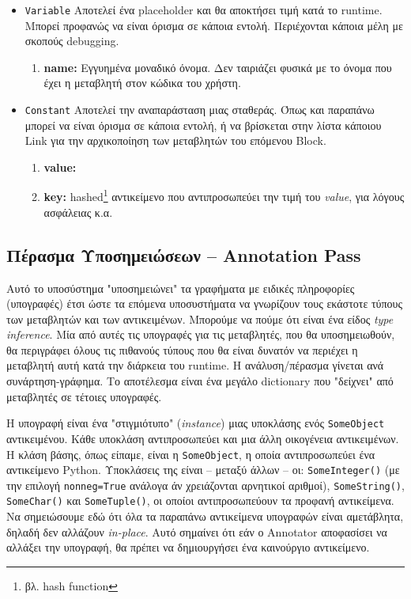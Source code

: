 \begin{itemize}
\item \texttt{Variable} Αποτελεί ένα placeholder και θα αποκτήσει τιμή κατά το
runtime. Μπορεί προφανώς να είναι όρισμα σε κάποια εντολή. Περιέχονται κάποια 
μέλη με σκοπούς debugging.

\begin{enumerate}
\item \textbf{name:} Εγγυημένα μοναδικό όνομα. Δεν ταιριάζει φυσικά με το 
όνομα που έχει η μεταβλητή στον κώδικα του χρήστη.
\end{enumerate}

\item \texttt{Constant} Αποτελεί την αναπαράσταση μιας σταθεράς. Όπως και 
παραπάνω μπορεί να είναι όρισμα σε κάποια εντολή, ή να βρίσκεται στην λίστα 
κάποιου Link για την αρχικοποίηση των μεταβλητών του επόμενου Block.

\begin{enumerate}
\item \textbf{value:}
\item \textbf{key:} hashed\footnote{βλ. hash function} αντικείμενο που 
αντιπροσωπεύει την τιμή του \textit{value}, για λόγους ασφάλειας κ.α.
\end{enumerate}

\end{itemize}

\subsection{Πέρασμα Υποσημειώσεων – Annotation Pass}

Αυτό το υποσύστημα "υποσημειώνει" τα γραφήματα με ειδικές πληροφορίες
(υπογραφές) έτσι ώστε τα επόμενα υποσυστήματα να γνωρίζουν τους εκάστοτε τύπους
των μεταβλητών και των αντικειμένων. Μπορούμε να πούμε ότι είναι ένα είδος
\textit{type inference}. Μία από αυτές τις υπογραφές για τις μεταβλητές, που θα
υποσημειωθούν, θα περιγράφει όλους τις πιθανούς τύπους που θα είναι δυνατόν να
περιέχει η μεταβλητή αυτή κατά την διάρκεια του runtime. Η ανάλυση/πέρασμα
γίνεται ανά συνάρτηση-γράφημα. Το αποτέλεσμα είναι ένα μεγάλο dictionary που
"δείχνει" από μεταβλητές σε τέτοιες υπογραφές.

Η υπογραφή είναι ένα "στιγμιότυπο" (\textit{instance}) μιας υποκλάσης ενός
\texttt{SomeObject} αντικειμένου. Κάθε υποκλάση αντιπροσωπεύει και μια άλλη
οικογένεια αντικειμένων. Η κλάση βάσης, όπως είπαμε, είναι η
\texttt{SomeObject}, η οποία αντιπροσωπεύει ένα αντικείμενο Python. Υποκλάσεις
της είναι – μεταξύ άλλων – οι: \texttt{SomeInteger()} (με την επιλογή
\texttt{nonneg=True} ανάλογα άν χρειάζονται αρνητικοί αριθμοί),
\texttt{SomeString()}, \texttt{SomeChar()} και \texttt{SomeTuple()}, οι οποίοι
αντιπροσωπεύουν τα προφανή αντικείμενα. Να σημειώσουμε εδώ ότι όλα τα παραπάνω 
αντικείμενα υπογραφών είναι αμετάβλητα, δηλαδή δεν αλλάζουν \textit{in-place}. 
Αυτό σημαίνει ότι εάν ο Annotator αποφασίσει να αλλάξει την υπογραφή, θα 
πρέπει να δημιουργήσει ένα καινούργιο αντικείμενο.

